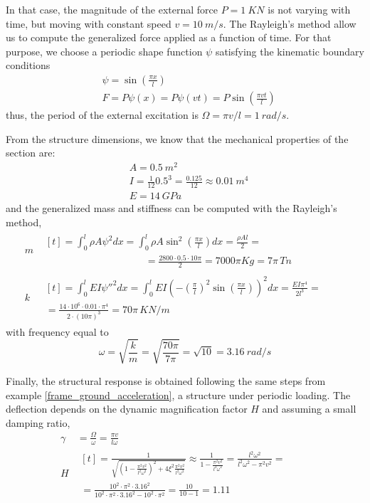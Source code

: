 \begin{Answer}[ref={moving_load}]
In that case, the magnitude of the external force $P=\SI{1}{KN}$ is not varying with time, but moving with constant speed $v=\SI{10}{m/s}$. The Rayleigh's method allow us to compute the generalized force applied as a function of time. For that purpose, we choose a periodic shape function $\psi$ satisfying the kinematic boundary conditions
\begin{align*}
&\psi = \sin\left(\frac{\pi x}{l}\right) \\
&F = P\psi(x) = P\psi(vt) = P\sin\left(\frac{\pi vt}{l}\right)
\end{align*}
thus, the period of the external excitation is $\Omega = \pi v/l = \SI{1}{rad/s}$.

From the structure dimensions, we know that the mechanical properties of the section are:
\begin{align*}
&A = \SI{0.5}{m^2} \\
&I = \frac{1}{12}0.5^3 = \frac{0.125}{12} \approx \SI{0.01}{m^4}\\
&E = \SI{14}{GPa}
\end{align*}
and the generalized mass and stiffness can be computed with the Rayleigh's method,
\begin{align*}
m& \begin{multlined}[t]= \int_0^l \rho A\psi^2dx = \int_0^l \rho A\sin^2\left(\frac{\pi x}{l}\right)dx = \frac{\rho Al}{2} = \\
\phantom{\hspace{10em}}= \frac{2800 \cdot 0.5 \cdot 10\pi}{2} = 7000\pi Kg = 7\pi \,\si{Tn}\end{multlined} \\
k& \begin{multlined}[t]= \int_0^l EI\psi''^2dx = \int_0^l EI\left(-\left(\frac{\pi}{l}\right)^2\sin\left(\frac{\pi x}{l}\right)\right)^2dx = \frac{EI\pi^4}{2l^3} = \qquad \\
= \frac{14\cdot 10^6 \cdot 0.01 \cdot \pi^4}{2 \cdot (10\pi)^3} =
70\pi \,\si{KN/m} \end{multlined}
\end{align*}
with frequency equal to
$$
\omega = \sqrt{\frac{k}{m}} = \sqrt{\frac{70\pi}{7\pi}} = \sqrt{10} = \SI{3.16}{rad/s}
$$

Finally, the structural response is obtained following the same steps from example \ref{frame_ground_acceleration}, a structure under periodic loading. The deflection depends on the dynamic magnification factor $H$ and assuming a small damping ratio,
\begin{align*}
\gamma& = \frac{\Omega}{\omega} = \frac{\pi v}{l\omega} \\
H& \begin{multlined}[t]= \frac{1}{\sqrt{\left(1-\frac{\pi^2v^2}{l^2\omega^2}\right)^2 + 4\xi^2\frac{\pi^2v^2}{l^2\omega^2}}} \approx \frac{1}{1-\frac{\pi^2v^2}{l^2\omega^2}} = \frac{l^2\omega^2}{l^2\omega^2-\pi^2v^2} = \qquad \\
= \frac{10^2\cdot\pi^2\cdot 3.16^2}{10^2\cdot\pi^2\cdot 3.16^2 - 10^2\cdot\pi^2}
= \frac{10}{10-1} = 1.11 \end{multlined}
\end{align*}


\end{Answer}
